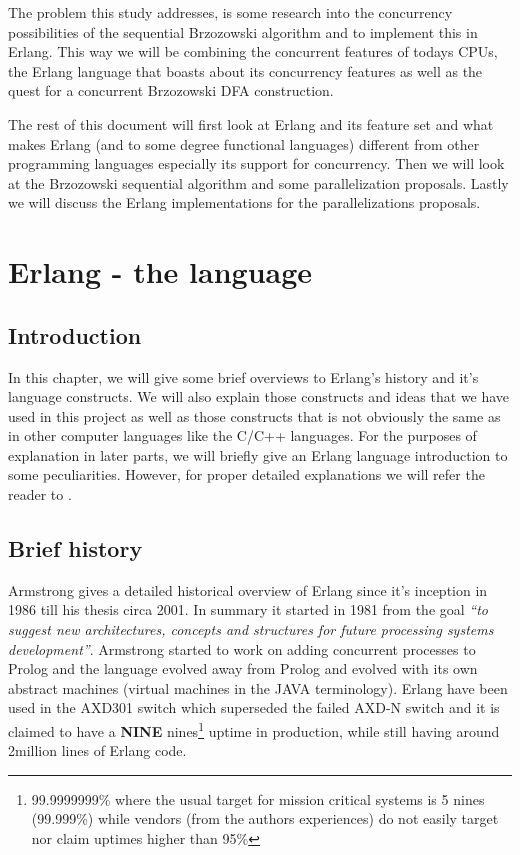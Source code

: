 \documentclass[a4paper,11pt]{report}
\begin{document}
The problem this study addresses, is some research into the concurrency
possibilities of the sequential Brzozowski algorithm and to implement
this in Erlang. This way we will be combining the concurrent features
of todays CPUs, the Erlang language that boasts about its concurrency
features as well as the quest for a concurrent Brzozowski DFA
construction.

The rest of this document will first look at Erlang and its feature
set and what makes Erlang (and to some degree functional languages)
different from other programming languages especially its support for
concurrency. Then we will look at the Brzozowski sequential algorithm
and some parallelization proposals.  Lastly we will discuss the Erlang
implementations for the parallelizations proposals.

\chapter{Erlang - the language}

\section{Introduction}

In this chapter, we will give some brief overviews to Erlang's history
and it's language constructs. We will also explain those constructs
and ideas that we have used in this project as well as those
constructs that is not obviously the same as in other computer
languages like the C/C++ languages.	 For the purposes of explanation
in later parts, we will briefly give an Erlang language introduction
to some peculiarities. However, for proper detailed explanations we will refer
the reader to \cite{joe:09}.



\section{Brief history}

Armstrong \cite{thesis:armstrong} gives a detailed historical overview
of Erlang since it's inception in 1986 till his thesis circa 2001. In
summary it started in 1981 from the goal \emph{``to suggest new
  architectures, concepts and structures for future processing systems
  development''}. Armstrong started to work on adding concurrent
processes to Prolog and the language evolved away from Prolog and
evolved with its own abstract machines (virtual machines in the JAVA
terminology). Erlang have been used in the AXD301 switch which
superseded the failed AXD-N switch and it is claimed to have a
\textbf{NINE} nines\footnote{99.9999999\% where the usual target for
  mission critical systems is 5 nines (99.999\%) while vendors (from
  the authors experiences) do not easily target nor claim uptimes
  higher than 95\%} uptime in production, while still having around
2million lines of Erlang code.
\end{document}
